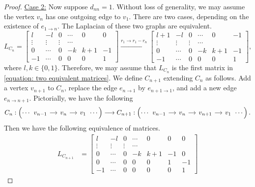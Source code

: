 \documentclass[11pt,reqno]{amsart}
\theoremstyle{definition}
\theoremstyle{plain}
\begin{document}
\begin{proof}
\noindent \underline{Case 2:} Now suppose $d_{nn} = 1$. Without loss of generality, we may assume the vertex $v_n$ has one outgoing edge to $v_1$. 
			There are two cases, depending on the existence of $e_{1\to n}$.
			The Laplacian of these two graphs are equivalent. 
\begin{equation}\label{equation: two equivalent matrices}
		L_{C_n} = \begin{bmatrix}
				l  & -l & 0 & \cdots & 0 & 0 \\
				\vdots & \vdots & \vdots & \cdots \\
				0 & \cdots & 0 & -k & k+1 & -1 \\
				-1 & \cdots & 0 & 0 & 0 & 1 
			\end{bmatrix}
			\stackrel{r_{1}\to r_1  - r_n}\longrightarrow
			\begin{bmatrix}
				l+1  & -l & 0 & \cdots & 0 & -1 \\
				\vdots & \vdots & \vdots & \cdots \\
				0 & \cdots & 0 & -k & k+1 & -1 \\
				-1 & \cdots & 0 & 0 & 0 & 1 
			\end{bmatrix},
\end{equation}
where $l, k \in \{ 0, 1 \}$. Therefore, we may assume that $L_{C_n}$ is the first matrix in \eqref{equation: two equivalent matrices}. We define $C_{n+1}$ extending $C_n$ as follows. Add a vertex $v_{n+1}$ to $C_n$, replace the edge $e_{n \to 1}$ by $e_{n+1 \to 1}$, and add a new edge $e_{n \to n+1}$. Pictorially, we have the following
\[
C_n: \left( \cdots \begin{tikzcd}[column sep=0.4cm]
					v_{n-1} \arrow[r] & v_n \arrow[r] & v_1 
				\end{tikzcd} \cdots \right)
				\longrightarrow
				C_{n+1}: \left( \cdots \begin{tikzcd}[column sep=0.4cm]
					v_{n-1} \arrow[r] & v_n \arrow[r] & v_{n+1} \arrow[r] & v_1 
				\end{tikzcd} \cdots \right).
			\]
	Then we have the following equivalence of matrices.
			\begin{align*}
			L_{C_{n+1}} &= 
			\begin{bmatrix} 
				l  & -l & 0 & \cdots & 0 & 0 & 0 \\
				\vdots & \vdots & \vdots & \cdots \\
				0 & \cdots & 0 & -k & k+1 & -1 & 0  \\
				0 & \cdots & 0 & 0 & 0 & 1 & -1 \\ 
				-1 & \cdots & 0 & 0 & 0 & 0 & 1 

\end{bmatrix}
\end{align*}
\end{proof}
\end{document}
